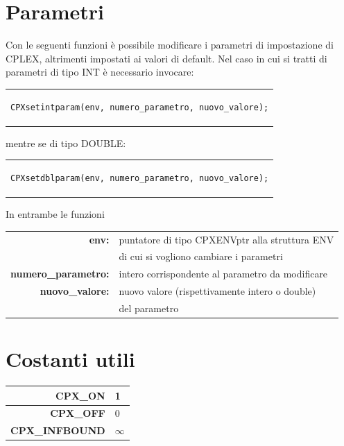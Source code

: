 \section{Parametri}
Con le seguenti funzioni è possibile modificare i parametri di impostazione di CPLEX, altrimenti impostati ai valori di default.
Nel caso in cui si tratti di parametri di tipo INT è necessario invocare:\\
\begin{center}
\begin{tabular}{c}
\begin{lstlisting}[linewidth=330pt, basicstyle=\footnotesize\sffamily,]     
CPXsetintparam(env, numero_parametro, nuovo_valore);
\end{lstlisting}
\end{tabular}
\end{center}
mentre se di tipo DOUBLE:\\
\begin{center}
\begin{tabular}{c}
\begin{lstlisting}[linewidth=330pt, basicstyle=\footnotesize\sffamily,]     
CPXsetdblparam(env, numero_parametro, nuovo_valore);
\end{lstlisting}
\end{tabular}
\end{center}
In entrambe le funzioni
\begin{table}[h]
\begin{tabular}{rl}
\textbf{env:} & {puntatore di tipo CPXENVptr alla struttura ENV}\\
& {di cui si vogliono cambiare i parametri}\\
\textbf{numero\_parametro:} & {intero corrispondente al parametro da modificare}\\
\textbf{nuovo\_valore:} & {nuovo valore (rispettivamente intero o double)}\\
& {del parametro}\\
\end{tabular}
\end{table}
\section{Costanti utili}
\begin{table}[h]
\begin{tabular}{|r|l|}
\hline
\textbf{CPX\_ON} & {1}\\ \hline
\textbf{CPX\_OFF} & {0}\\ \hline
\textbf{CPX\_INFBOUND} & {$\infty$}\\ \hline
\end{tabular}
\end{table}